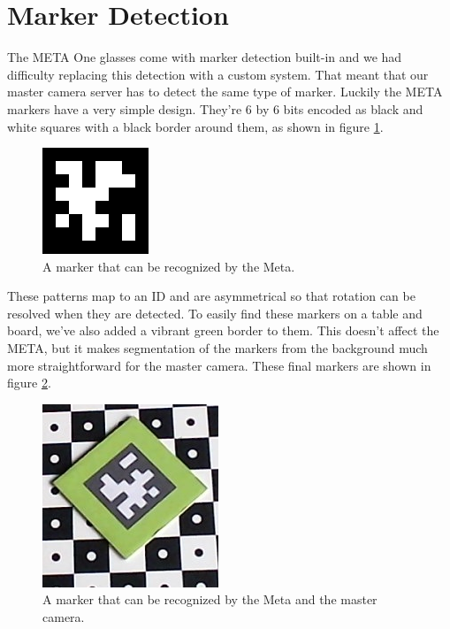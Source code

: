     \section{Marker Detection} \label{sec:markerdetection}
        The META One glasses come with marker detection built-in and we had
        difficulty replacing this detection with a custom system. That meant
        that our master camera server has to detect the same type of marker.
        Luckily the META markers have a very simple design. They're 6 by 6 bits
        encoded as black and white squares with a black border around them, as
        shown in figure \ref{fig:metaonemarker}.

        \begin{figure}[!ht]
            \centering
            \includegraphics{MetaMarker}
            \caption{A marker that can be recognized by the Meta.}
            \label{fig:metaonemarker}
        \end{figure}

        These patterns map to an ID and are asymmetrical so that rotation can be
        resolved when they are detected. To easily find these markers on a table
        and board, we've also added a vibrant green border to them. This doesn't
        affect the META, but it makes segmentation of the markers from the
        background much more straightforward for the master camera. These final
        markers are shown in figure \ref{fig:finalmarker}.

        \begin{figure}[!ht]
            \centering
            \includegraphics{FinalMarker}
            \caption{A marker that can be recognized by the Meta and the master camera.}
            \label{fig:finalmarker}
        \end{figure}

